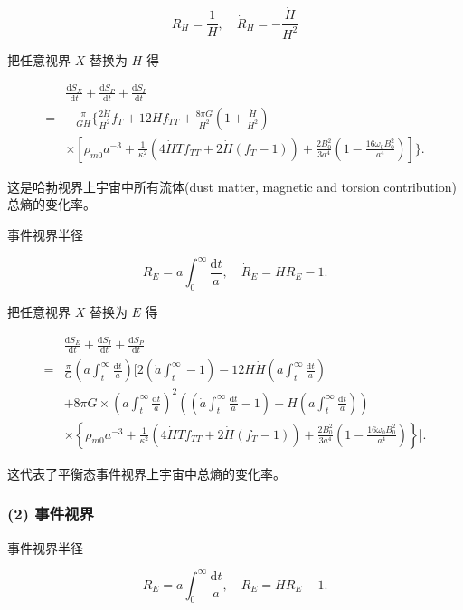 \documentclass[aps,prl,preprint,groupedaddress,showkeys]{revtex4-2}
\begin{document}
$$
R_H = \frac{1 }{H } ,\quad
\dot{R}_H = -\frac{\dot{H} }{H^2 }
$$

把任意视界 $X$ 替换为 $H$ 得

$$
\begin{aligned}
    &\frac{\mathrm{d}S_X }{\mathrm{d}t } + \frac{\mathrm{d}S_P }{\mathrm{d}t } + \frac{\mathrm{d}S_I }{\mathrm{d}t } \\
    =&-\frac{\pi }{G H} \bigg\{\frac{2\dot{H} }{H^2 } f_T + 12\dot{H}f_{TT} +\frac{8\pi G }{H^2 }\left(1+\frac{\dot{H} }{H^2 }  \right) \\
    &\times \left[\rho_{m0}a^{-3} + \frac{1 }{\kappa^2 } \left(4\dot{H}T f_{TT} + 2\dot{H}\left(f_T-1 \right) \right) + \frac{2 B_0^2 }{3a^4 } \left(1-\frac{16\omega_0 B_0^2 }{a^4 }  \right) \right] \bigg\}.
    \end{aligned}
$$

这是哈勃视界上宇宙中所有流体(dust matter, magnetic and torsion contribution)总熵的变化率。

事件视界半径

$$
R_E = a\int_0^{\infty} \frac{\mathrm{d}t }{a } ,\quad
\dot{R}_E = H R_E - 1.
$$

把任意视界 $X$ 替换为 $E$ 得

$$
\begin{aligned}
    &\frac{\mathrm{d}S_E}{\mathrm{d}t} + \frac{\mathrm{d}S_I}{\mathrm{d}t} + \frac{\mathrm{d}S_P}{\mathrm{d}t} \\
    =&\frac{\pi}{G} \left(a\int_t^\infty \frac{\mathrm{d}t}{a}\right)\bigg[2\left(\dot{a}\int_t^\infty -1 \right) - 12H\dot{H} \left(a\int_t^\infty \frac{\mathrm{d}t}{a}\right) \\
    &+8\pi G\times \left(a\int_t^\infty\frac{\mathrm{d}t}{a}\right)^2\left(\left(\dot{a}\int_t^\infty\frac{\mathrm{d}t}{a}-1\right)-H\left(a\int_t^\infty\frac{\mathrm{d}t}{a}\right)\right) \\
    &\times \left\{\rho_{m0}a^{-3} + \frac{1}{\kappa^2} \left(4\dot{H}T f_{TT} + 2\dot{H}(f_T-1)\right) + \frac{2B_0^2}{3a^4}\left(1-\frac{16\omega_0B_0^2}{a^4}\right) \right\} \bigg]. 
\end{aligned}
$$

这代表了平衡态事件视界上宇宙中总熵的变化率。

\subsubsection{(2) 事件视界}

事件视界半径

$$
R_E = a\int_0^{\infty} \frac{\mathrm{d}t }{a } ,\quad
\dot{R}_E = H R_E - 1.
$$
\end{document}
